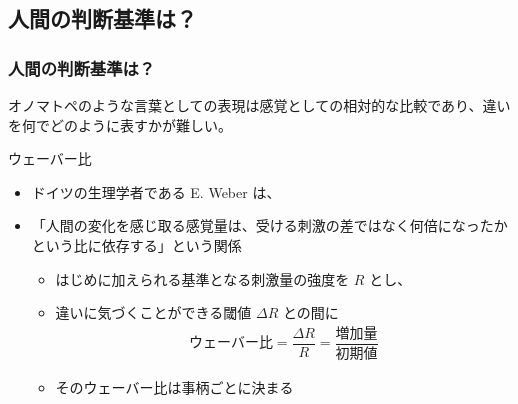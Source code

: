 \documentclass[12pt, dvipdfmx]{beamer}
\begin{document}
\subsection{人間の判断基準は？}
\begin{frame}
	\frametitle{人間の判断基準は？}
		オノマトペのような言葉としての表現は感覚としての相対的な比較であり、違いを何でどのように表すかが難しい。
			\begin{block}{ウェーバー比}
				\begin{itemize}
					\item ドイツの生理学者である E. Weber は、
					\item 「人間の変化を感じ取る感覚量は、受ける刺激の差ではなく何倍になったかという比に依存する」という関係
					\begin{itemize}
						\item はじめに加えられる基準となる刺激量の強度を $R$ とし、
						\item 違いに気づくことができる閾値 $\Delta R$ との間に
						\begin{align*}
							\text{ウェーバー比} = \dfrac{\Delta R}{R}= \dfrac{\text{増加量}}{\text{初期値}}
						\end{align*}
						\item そのウェーバー比は事柄ごとに決まる
					\end{itemize}
				\end{itemize}
			\end{block}
\end{frame}
\end{document}
